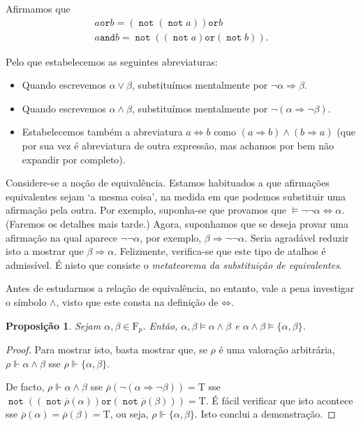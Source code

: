 \documentclass{report}
\newtheorem{prop}{Proposição}
\theoremstyle{definition}
\theoremstyle{remark}
\newcommand{\F}{\mathrm{F}}
\newcommand{\lt}{\mathrm{T}}
\DeclareMathOperator{\pnot}{\texttt{not}}
\newcommand{\pand}{\mathbin{\texttt{and}}}
\newcommand{\por}{\mathbin{\texttt{or}}}
\newcommand{\imply}{\mathbin{\Rightarrow}}
\newcommand{\eqv}{\mathbin{\Leftrightarrow}}
\begin{document}
	Afirmamos que
	\begin{gather*}
	a \por b = (\pnot (\pnot a)) \por b\\
	a \pand b = \pnot ((\pnot a) \por (\pnot b)).
	\end{gather*}
	
	Pelo que estabelecemos as seguintes abreviaturas:
	
	\begin{itemize}
	\item Quando escrevemos $\alpha \lor \beta$, substituímos mentalmente por $\neg \alpha \imply \beta$.
	
	\item Quando escrevemos $\alpha \land \beta$, substituímos mentalmente por $\neg (\alpha \imply \neg \beta)$.
	
	\item Estabelecemos também a abreviatura $a \eqv b$ como $(a \imply b) \land (b \imply a)$ (que por sua vez é abreviatura de outra expressão, mas achamos por bem não expandir por completo).
	\end{itemize}
	
	Considere-se a noção de equivalência. Estamos habituados a que afirmações equivalentes sejam `a mesma coisa', na medida em que podemos substituir uma afirmação pela outra. Por exemplo, suponha-se que provamos que $\vDash \neg \neg \alpha \eqv \alpha$. (Faremos os detalhes mais tarde.) Agora, suponhamos que se deseja provar uma afirmação na qual aparece $\neg \neg \alpha$, por exemplo, $\beta \imply \neg \neg \alpha$. Seria agradável reduzir isto a mostrar que $\beta \imply \alpha$. Felizmente, verifica-se que este tipo de atalhos é admissível. É nisto que consiste o \emph{metateorema da substituição de equivalentes}.
	
	Antes de estudarmos a relação de equivalência, no entanto, vale a pena investigar o símbolo $\land$, visto que este consta na definição de $\eqv$.
	
	\begin{prop}\label{prop:conj:prop:sem}
	Sejam $\alpha, \beta \in \F_p$. Então, $\alpha, \beta \vDash \alpha \land \beta$ e $\alpha \land \beta \vDash \{\alpha, \beta\}$.
	\end{prop}
	
	\begin{proof}
	Para mostrar isto, basta mostrar que, se $\rho$ é uma valoração arbitrária, $\rho \Vdash \alpha \land \beta$ sse $\rho \Vdash \{\alpha, \beta\}$.
	
	De facto, $\rho \Vdash \alpha \land \beta$ sse $\overline\rho(\neg(\alpha \imply \neg \beta)) = \lt$ sse $\pnot ((\pnot \overline\rho(\alpha)) \por (\pnot \overline\rho(\beta))) = \lt$. É fácil verificar que isto acontece sse $\overline\rho(\alpha) = \overline\rho(\beta) = \lt$, ou seja, $\rho \Vdash \{\alpha, \beta\}$. Isto conclui a demonstração.
	\end{proof}
	
\end{document}
